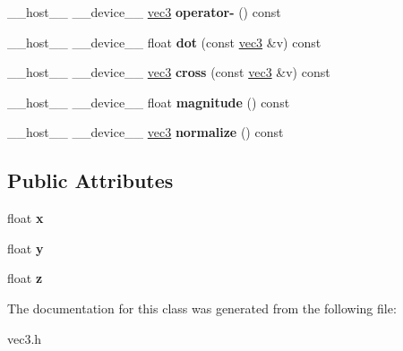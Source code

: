 \begin{DoxyCompactItemize}
\item 
\mbox{\label{classvec3_a71e4e115b861cee4f7054685fb8ae150}} 
\+\_\+\+\_\+host\+\_\+\+\_\+ \+\_\+\+\_\+device\+\_\+\+\_\+ \hyperlink{classvec3}{vec3} {\bfseries operator-\/} () const
\item 
\mbox{\label{classvec3_ac338a08d2a16be3f1ca838b91e041263}} 
\+\_\+\+\_\+host\+\_\+\+\_\+ \+\_\+\+\_\+device\+\_\+\+\_\+ float {\bfseries dot} (const \hyperlink{classvec3}{vec3} \&v) const
\item 
\mbox{\label{classvec3_a4d4fd63e75dfa34a32d2b859253756fc}} 
\+\_\+\+\_\+host\+\_\+\+\_\+ \+\_\+\+\_\+device\+\_\+\+\_\+ \hyperlink{classvec3}{vec3} {\bfseries cross} (const \hyperlink{classvec3}{vec3} \&v) const
\item 
\mbox{\label{classvec3_a2c7fd1266bcedd021b2ae67ef74a60a9}} 
\+\_\+\+\_\+host\+\_\+\+\_\+ \+\_\+\+\_\+device\+\_\+\+\_\+ float {\bfseries magnitude} () const
\item 
\mbox{\label{classvec3_a729bc59c5163d561f17ecc9fe6ec0394}} 
\+\_\+\+\_\+host\+\_\+\+\_\+ \+\_\+\+\_\+device\+\_\+\+\_\+ \hyperlink{classvec3}{vec3} {\bfseries normalize} () const
\end{DoxyCompactItemize}
\subsection*{Public Attributes}
\begin{DoxyCompactItemize}
\item 
\mbox{\label{classvec3_a4ee2cfd5c2698031a47ab7f898d8d47b}} 
float {\bfseries x}
\item 
\mbox{\label{classvec3_a891379795a14c80936cde4170239a138}} 
float {\bfseries y}
\item 
\mbox{\label{classvec3_aa76213efcc5d656cc14b71db80a92162}} 
float {\bfseries z}
\end{DoxyCompactItemize}


The documentation for this class was generated from the following file\+:\begin{DoxyCompactItemize}
\item 
vec3.\+h\end{DoxyCompactItemize}
